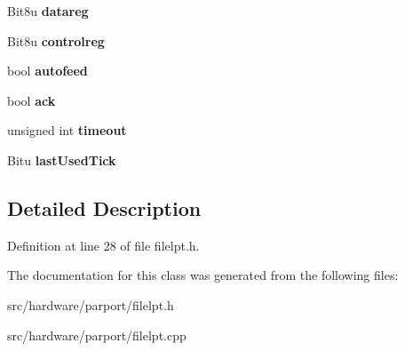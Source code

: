\begin{DoxyCompactItemize}
\item 
\hypertarget{classCFileLPT_ad59a42373cdb6ae50b983b744b79451e}{Bit8u {\bfseries datareg}}\label{classCFileLPT_ad59a42373cdb6ae50b983b744b79451e}

\item 
\hypertarget{classCFileLPT_a9ad1361fb9df3fe768573f46206c248d}{Bit8u {\bfseries controlreg}}\label{classCFileLPT_a9ad1361fb9df3fe768573f46206c248d}

\item 
\hypertarget{classCFileLPT_ab146dfe78d718cee82c107ed8f1d68d1}{bool {\bfseries autofeed}}\label{classCFileLPT_ab146dfe78d718cee82c107ed8f1d68d1}

\item 
\hypertarget{classCFileLPT_a2342d7014c2898698d2d78c4a4021fa5}{bool {\bfseries ack}}\label{classCFileLPT_a2342d7014c2898698d2d78c4a4021fa5}

\item 
\hypertarget{classCFileLPT_a8575730cacb5d26414d99f944caa4f66}{unsigned int {\bfseries timeout}}\label{classCFileLPT_a8575730cacb5d26414d99f944caa4f66}

\item 
\hypertarget{classCFileLPT_a96dce00b435b57411c44492ed04d129a}{Bitu {\bfseries last\-Used\-Tick}}\label{classCFileLPT_a96dce00b435b57411c44492ed04d129a}

\end{DoxyCompactItemize}


\subsection{Detailed Description}


Definition at line 28 of file filelpt.\-h.



The documentation for this class was generated from the following files\-:\begin{DoxyCompactItemize}
\item 
src/hardware/parport/filelpt.\-h\item 
src/hardware/parport/filelpt.\-cpp\end{DoxyCompactItemize}
